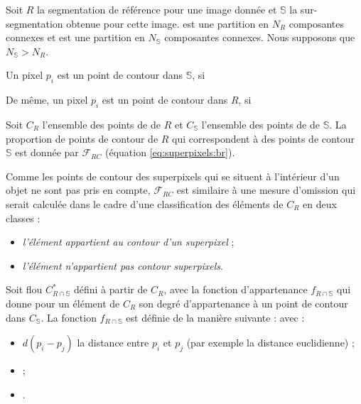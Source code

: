 Soit $R$  la segmentation de référence pour une image donnée et $\mathbb{S}$  la sur-segmentation obtenue pour cette image.  est une partition en $N_{R}$ composantes connexes et  est une partition en $N_{\mathbb{S}}$ composantes connexes. Nous supposons que $N_{\mathbb{S}} > N_{R}$. 

Un pixel $p_{i}$ est un point de contour dans $\mathbb{S}$, si 

De même, un pixel $p_{i}$ est un point de contour dans $R$, si 

Soit $C_{R}$  l'ensemble des points de  de $R$ et $C_{\mathbb{S}}$ l'ensemble des points de  de $\mathbb{S}$. La proportion de points de contour de $R$ qui correspondent à des points de contour  $\mathbb{S}$ est donnée par  $\mathcal{F}_{RC}$ (équation \ref{eq:superpixels:br}).

Comme les points de contour des superpixels qui se situent à l'intérieur d'un objet ne sont pas pris en compte, $\mathcal{F}_{RC}$ est similaire à une mesure d'omission qui serait calculée dans le cadre d'une classification des éléments de $C_{R}$ en deux classes :
\begin{itemize}
\item  \emph{l'élément appartient au contour d'un superpixel} ;
\item  \emph{l'élément n'appartient pas  contour  superpixels}.
\end{itemize}

Soit  flou $C_{R \cap \mathbb{S}}^{*}$ défini à partir de $C_{R}$, avec la fonction d'appartenance  $f_{R \cap \mathbb{S}}$ qui donne pour un élément de $C_{R}$ son degré d'appartenance à un point de contour dans $C_{\mathbb{S}}$. La fonction $f_{R \cap \mathbb{S}}$  est définie de la manière suivante : 
avec  :
\begin{itemize}
\item $d(p_{i}-p_{j})$ la distance entre $p_{i}$  et $p_{j}$  (par exemple la distance euclidienne) ;
\item {} ;
\item {}. 
\end{itemize}


